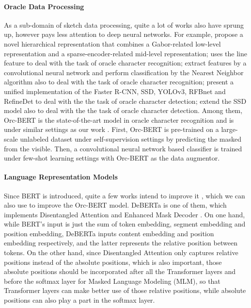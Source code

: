 \documentclass{article}
\begin{document}
\paragraph{Oracle Data Processing}
As a sub-domain of sketch data processing, quite a lot of works also have sprung up, however pays less attention to deep neural networks. For example, \cite{Hierachical} propose a novel hierarchical representation that combines a Gabor-related low-level representation and a sparse-encoder-related mid-level representation; \citep{Line} uses the line feature to deal with the task of oracle character recognition; \citep{Neighbor} extract features by a convolutional neural network and perform classification by the Nearest Neighbor algorithm also to deal with the task of oracle character recognition; \citep{Detection} present a unified implementation of the Faster R-CNN, SSD, YOLOv3, RFBnet and RefineDet to deal with the the task of oracle character detection; \citep{SSD} extend the SSD model also to deal with the the task of oracle character detection. 
Among them, Orc-BERT is the state-of-the-art model in oracle character recognition and is under similar settings as our work \citep{Orc-BERT}.
First, Orc-BERT is pre-trained on a large-scale unlabeled dataset under self-supervision settings by predicting the masked from the visible. Then, a convolutional neural network based classifier is trained under few-shot learning settings with Orc-BERT as the  data augmentor.

\paragraph{Language Representation Models}
Since BERT is introduced, quite a few works intend to improve it \citep{RoBERTa, DeBERTa}, which we can also use to improve the Orc-BERT model.
DeBERTa is one of them, which implements Disentangled Attention and Enhanced Mask Decoder \citep{DeBERTa, Package}.
On one hand, while BERT’s input is just the sum of token embedding, segment embedding and position embedding, DeBERTa inputs content embedding and position embedding respectively, and the latter represents the relative position between tokens.
On the other hand, since Disentangled Attention only captures relative positions instead of the absolute positions, which is also important, those absolute positions should be incorporated after all the Transformer layers and before the softmax layer for Masked Language Modeling (MLM), so that Transformer layers can make better use of those relative positions, while absolute positions can also play a part in the softmax layer.
\end{document}
